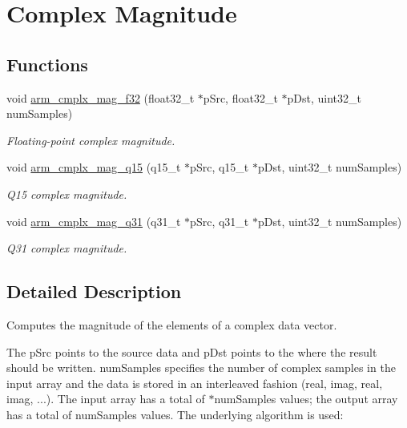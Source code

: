\hypertarget{group__cmplx__mag}{\section{Complex Magnitude}
\label{group__cmplx__mag}
}
\subsection*{Functions}
\begin{DoxyCompactItemize}
\item 
void \hyperlink{group__cmplx__mag_gae45024c497392cde2ae358a76d435213}{arm\-\_\-cmplx\-\_\-mag\-\_\-f32} (float32\-\_\-t $\ast$p\-Src, float32\-\_\-t $\ast$p\-Dst, uint32\-\_\-t num\-Samples)
\begin{DoxyCompactList}\small\item\em Floating-\/point complex magnitude. \end{DoxyCompactList}\item 
void \hyperlink{group__cmplx__mag_ga0a4a8f77a6a51d9b3f3b9d729f85b7a4}{arm\-\_\-cmplx\-\_\-mag\-\_\-q15} (q15\-\_\-t $\ast$p\-Src, q15\-\_\-t $\ast$p\-Dst, uint32\-\_\-t num\-Samples)
\begin{DoxyCompactList}\small\item\em Q15 complex magnitude. \end{DoxyCompactList}\item 
void \hyperlink{group__cmplx__mag_ga14f82f9230e9d96d5b9774e2fefcb7be}{arm\-\_\-cmplx\-\_\-mag\-\_\-q31} (q31\-\_\-t $\ast$p\-Src, q31\-\_\-t $\ast$p\-Dst, uint32\-\_\-t num\-Samples)
\begin{DoxyCompactList}\small\item\em Q31 complex magnitude. \end{DoxyCompactList}\end{DoxyCompactItemize}


\subsection{Detailed Description}
Computes the magnitude of the elements of a complex data vector.

The {\ttfamily p\-Src} points to the source data and {\ttfamily p\-Dst} points to the where the result should be written. {\ttfamily num\-Samples} specifies the number of complex samples in the input array and the data is stored in an interleaved fashion (real, imag, real, imag, ...). The input array has a total of {$\ast$num\-Samples} values; the output array has a total of {\ttfamily num\-Samples} values. The underlying algorithm is used\-:


